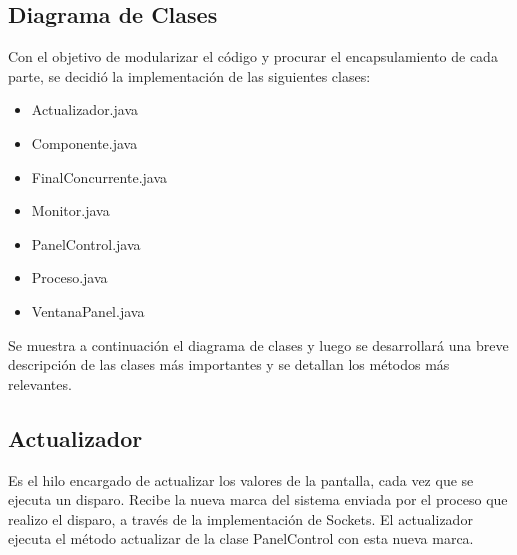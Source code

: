 \documentclass[10pt]{article} %
\begin{document}
\subsection{Diagrama de Clases}
Con el objetivo de modularizar el código y procurar el encapsulamiento de cada parte, se decidió la implementación de las siguientes clases:
\begin{itemize}
\item Actualizador.java
\item Componente.java
\item FinalConcurrente.java
\item Monitor.java
\item PanelControl.java
\item Proceso.java
\item VentanaPanel.java
\end{itemize}
Se muestra a continuación el diagrama de clases y luego se desarrollará una breve descripción de las clases más importantes y se detallan los métodos más relevantes.
\begin{figure}[H] %
\label{fig:DiagramaDeClases}
\end{figure}
\subsection{Actualizador}
Es el hilo encargado de actualizar los valores de la pantalla, cada vez que se ejecuta un disparo. Recibe la nueva marca del sistema enviada por el proceso que realizo el disparo, a través de la implementación de Sockets. El actualizador ejecuta el método actualizar de la clase PanelControl con  esta nueva marca.
\end{document}
